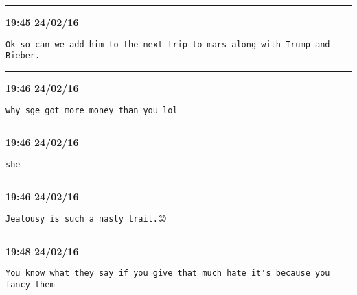 \hrule%

\begin{adjustwidth}{0cm}{0cm}
\footnotesize \textbf{19:45 24/02/16}

\begin{lstlisting}[breaklines, breakatwhitespace, basicstyle=\small, frame=leftline]
Ok so can we add him to the next trip to mars along with Trump and Bieber.
\end{lstlisting}
\end{adjustwidth}

\hrule%

\begin{adjustwidth}{0cm}{0cm}
\footnotesize \textbf{19:46 24/02/16}

\begin{lstlisting}[breaklines, breakatwhitespace, basicstyle=\small, frame=leftline]
why sge got more money than you lol
\end{lstlisting}
\end{adjustwidth}

\hrule%

\begin{adjustwidth}{0cm}{0cm}
\footnotesize \textbf{19:46 24/02/16}

\begin{lstlisting}[breaklines, breakatwhitespace, basicstyle=\small, frame=leftline]
she
\end{lstlisting}
\end{adjustwidth}

\hrule%

\begin{adjustwidth}{0cm}{0cm}
\footnotesize \textbf{19:46 24/02/16}

\begin{lstlisting}[breaklines, breakatwhitespace, basicstyle=\small, frame=leftline]
Jealousy is such a nasty trait.😡
\end{lstlisting}
\end{adjustwidth}

\hrule%

\begin{adjustwidth}{0cm}{0cm}
\footnotesize \textbf{19:48 24/02/16}

\begin{lstlisting}[breaklines, breakatwhitespace, basicstyle=\small, frame=leftline]
You know what they say if you give that much hate it's because you fancy them
\end{lstlisting}
\end{adjustwidth}

